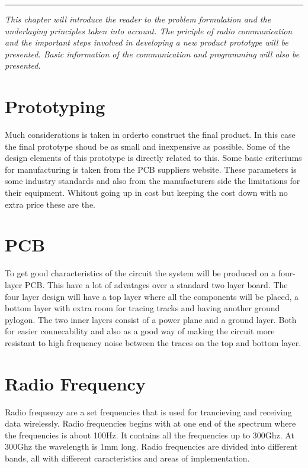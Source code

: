 \vspace{-10ex}%
\rule{\textwidth}{0.3pt}
\vspace{5ex}

\textit{
This chapter will introduce the reader to the problem formulation and the underlaying principles taken into account. The priciple of radio communication and the important steps involved in developing a new product prototype will be presented. Basic information of the communication and programming will also be presented. 
}
\vspace{5ex}



\section{Prototyping}
Much considerations is taken in orderto construct the final product. In this case the final prototype shoud be as small and inexpensive as possible. Some of the design elements of this prototype is directly related to this. Some basic criteriums for manufacturing is taken from the PCB suppliers website. These parameters is some industry standards and also from the manufacturers side the limitations for their equipment. Whitout going up in cost but keeping the cost down with no extra price these are the.



\section{PCB}
To get good characteristics of the circuit the system will be produced on a four-layer PCB. This have a lot of advatages over a standard two layer board. The four layer design will have a top layer where all the components will be placed, a bottom layer with extra room for tracing tracks and having another ground pylogon. The two inner layers consist of a power plane and a ground layer. Both for easier connecability and also as a good way of making the circuit more resistant to high frequency noise between the traces on the top and bottom layer.



\section{Radio Frequency}
Radio frequenzy are a set frequencies that is used for trancieving and receiving data wirelessly. Radio frequencies begins with at one end of the spectrum where the frequencies is about 100Hz. It contains all the frequencies up to 300Ghz. At 300Ghz the wavelength is 1mm long. Radio frequencies are divided into different bands, all with different caracteristics and areas of implementation. 

